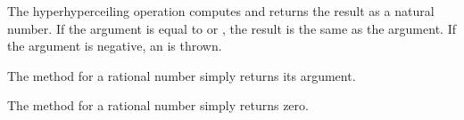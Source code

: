 The hyperhyperceiling operation  computes 
and returns the result as a natural number.
If the argument is equal to  or , the result is the same as the argument.
If the argument is negative, an  is thrown.



The method  for a rational number simply returns its argument.



The method  for a rational number simply returns zero.

